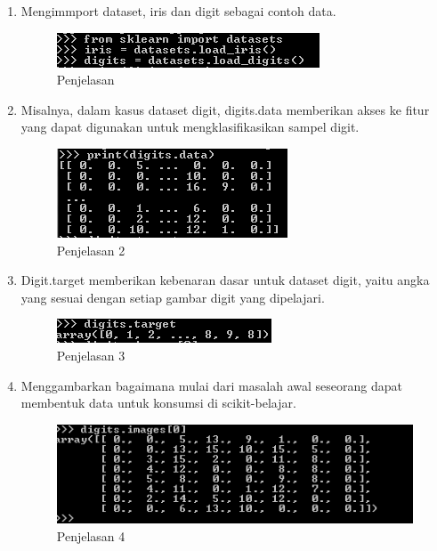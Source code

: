 \begin{enumerate}
\item Mengimmport dataset, iris dan digit sebagai contoh data.
\begin{figure}
	\begin{center}
   	 \includegraphics[scale=0.5]{figures/penjelasan1.png}
   	 \caption{Penjelasan }	
	\end{center}
\end{figure}
\item Misalnya, dalam kasus dataset digit, digits.data memberikan akses ke fitur yang dapat digunakan untuk mengklasifikasikan sampel digit.
\begin{figure}
	\begin{center}
   	 \includegraphics[scale=0.5]{figures/penjelasan2.png}
   	 \caption{Penjelasan 2}	
	\end{center}
\end{figure}
\item Digit.target memberikan kebenaran dasar untuk dataset digit, yaitu angka yang sesuai dengan setiap gambar digit yang dipelajari.
\begin{figure}
	\begin{center}
   	 \includegraphics[scale=0.5]{figures/penjelasan3.png}
   	 \caption{Penjelasan 3}	
	\end{center}
\end{figure}
\item Menggambarkan bagaimana mulai dari masalah awal seseorang dapat membentuk data untuk konsumsi di scikit-belajar.
\begin{figure}
	\begin{center}
   	 \includegraphics[scale=0.5]{figures/penjelasan4.png}
   	 \caption{Penjelasan 4}	
	\end{center}
\end{figure}

\end{enumerate}

